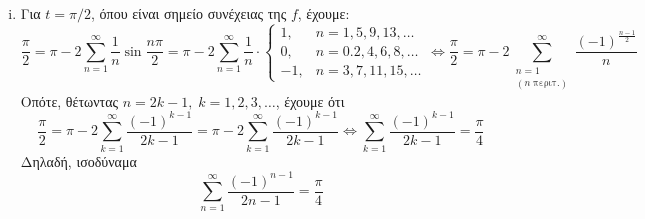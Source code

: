 \begin{solution}
\begin{enumerate}[i)]
    \item Για $ t= \pi /2 $, όπου είναι σημείο συνέχειας της $f$, έχουμε:
      \[
        \frac{\pi}{2} = \pi - 2 \sum_{n=1}^{\infty} \frac{1}{n} \sin{\frac{n \pi}{2}} =
        \pi - 2 \sum_{n=1}^{\infty} \frac{1}{n} \cdot 
        \begin{cases}
          1, & n=1,5,9,13,\ldots \\
          0, &n=0.2,4,6,8,\ldots \\
          -1, & n=3,7,11,15,\ldots 
        \end{cases} \Leftrightarrow  
        \frac{\pi}{2} = \pi - 2 \sum_{\substack{n=1 \\ (n \; \text{περιτ.})}}^{\infty}
        \frac{(-1)^{\frac{n-1}{2}}}{n} 
      \]
      Οπότε, θέτωντας $ n=2k-1, \; k=1,2,3,\ldots $, έχουμε ότι
      \[
        \frac{\pi}{2} = \pi - 2 \sum_{k=1}^{\infty} \frac{(-1)^{k-1}}{2k-1} = 
        \pi -2 \sum_{k=1}^{\infty} \frac{(-1)^{k-1}}{2k-1} \Leftrightarrow
        \sum_{k=1}^{\infty} \frac{(-1)^{k-1}}{2k-1} = \frac{\pi}{4}
      \]
      Δηλαδή, ισοδύναμα 
      \[
        \sum_{n=1}^{\infty} \frac{(-1)^{n-1}}{2n-1} = \frac{\pi}{4}  
      \]
  \end{enumerate}
\end{solution}



